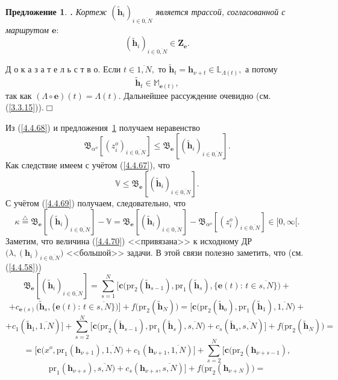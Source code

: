 \documentclass[11pt,twoside]{report}
\newcommand{\bfn}{\begin{equation}}
\newcommand{\efn}{\end{equation}}
\newcommand{\df}{\stackrel{\triangle}{=}}
\newcommand{\ov}{\overline}
\newcounter{theo}
\newcounter{pred}
\newtheorem{pred}{Предложение}[section]
\newcommand{\TL}{\mbox{\bf{$\!\!$.}}}
\newcommand{\La}{\Lambda}
\newcommand{\la}{\lambda}
\newcommand{\al}{\alpha}
\newcommand{\bbl}{{\mathbb L}}
\newcommand{\bbm}{{\mathbb M}}
\begin{document}
{\begin{pred}\label{p4.4.5}{\TL} Кортеж $(\tilde{\mathbf{h}}_i)_{i\in\ov{0,N}}$
является трассой, согласованной с маршрутом $\mathbf{e}:$
$$
(\tilde{\mathbf{h}}_i)_{i\in\ov{0,N}}\in \mathbf{Z}_\mathbf{e}.
$$
\end{pred}

Д о к а з а т е л ь с т в о. Если $t\in \ov{1,N},$ то $\tilde{\mathbf{h}}_t =
\mathbf{h}_{\nu +t}\in \bbl_{\La(t)},$ а потому
$$
\tilde{\mathbf{h}}_t \in \bbm_{\mathbf{e}(t)},
$$
так как $(\La \circ \mathbf{e})(t) = \La(t).$ Дальнейшее рассуждение очевидно
(см. (\ref{3.3.15})).\hfill $\Box$ \smallskip

Из (\ref{4.4.68}) и предложения~{\ref{p4.4.5} получаем неравенство
$$
\mathfrak{B}_{\al^o}[(z_i^o)_{i\in\ov{0,N}}]\leqslant
\mathfrak{B}_\mathbf{e}[(\tilde{\mathbf{h}}_i)_{i\in\ov{0,N}}].
$$
Как следствие имеем с учётом (\ref{4.4.67}), что
\bfn\label{4.4.69}
\mathbb{V} \leqslant \mathfrak{B}_\mathbf{e}[(\tilde{\mathbf{h}}_i)_{i\in\ov{0,N}}].
\efn
С учётом (\ref{4.4.69}) получаем, следовательно, что
\bfn\label{4.4.70}
\kappa \df \mathfrak{B}_\mathbf{e}[(\tilde{\mathbf{h}}_i)_{i\in\ov{0,N}}] -
\mathbb{V} = \mathfrak{B}_\mathbf{e}[(\tilde{\mathbf{h}}_i)_{i\in\ov{0,N}}]-
\mathfrak{B}_{\al^o}[(z_i^o)_{i\in\ov{0,N}}]\in [0,\infty[.
\efn
Заметим, что величина (\ref{4.4.70}) <<привязана>> к исходному ДР $\bigl(\la,(\mathbf{h}_i)_{i\in\ov{0,N}}\bigl)$ <<большой>> задачи. В этой связи полезно заметить, что (см. (\ref{4.4.58}))
$$
\mathfrak{B}_\mathbf{e}[(\tilde{\mathbf{h}}_i)_{i\in\ov{0,N}}]=
\sum\limits_{s=1}^N\bigl[\mathbf{c}\bigl(\mathrm{pr}_2(\tilde{\mathbf{h}}_{s-1}),\mathrm{pr}_1
(\tilde{\mathbf{h}}_s),\{\mathbf{e}(t):\,t\in\ov{s,N}\}\bigl) +
$$
$$
+ c_{\mathbf{e}(s)}\bigl(\tilde{\mathbf{h}}_s,\{\mathbf{e}(t):\,t\in\ov{s,N}\}\bigl)\bigl] +
f\bigl(\mathrm{pr}_2(\tilde{\mathbf{h}}_N)\bigl) = \bigl[\mathbf{c}\bigl(\mathrm{pr}_2
(\tilde{\mathbf{h}}_o),\mathrm{pr}_1(\tilde{\mathbf{h}}_1),\ov{1,N}) +
$$
$$
+ c_1(\tilde{\mathbf{h}}_1,\ov{1,N})\bigl] +
\sum\limits_{s=2}^N\bigl[\mathbf{c}\bigl(\mathrm{pr}_2(\tilde{\mathbf{h}}_{s-1}),
\mathrm{pr}_1(\tilde{\mathbf{h}}_s),\ov{s,N}\bigl) +
c_s(\tilde{\mathbf{h}}_s,\ov{s,N})\bigl] +
f\bigl(\mathrm{pr}_2(\tilde{\mathbf{h}}_N)\bigl) =
$$
$$
= \bigl[\mathbf{c}\bigl(x^o,\mathrm{pr}_1(\mathbf{h}_{\nu+1}),\ov{1,N}\bigl) +
c_1(\mathbf{h}_{\nu+1},\ov{1,N})\bigl] +
\sum\limits_{s=2}^N\bigl[\mathbf{c}\bigl(\mathrm{pr}_2(\mathbf{h}_{\nu+s-1}),
$$
$$
\mathrm{pr}_1(\mathbf{h}_{\nu+s}),\ov{s,N}\bigl) + c_s(\mathbf{h}_{\nu+s},\ov{s,N})\bigl] +
f\bigl(\mathrm{pr}_2(\mathbf{h}_{\nu+N})\bigl) =
$$}}
\end{document}
